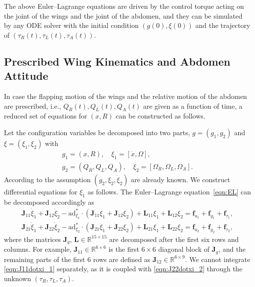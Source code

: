\documentclass[conf]{new-aiaa}
\renewcommand{\Re}{\ensuremath{\mathbb{R}}}
\newcommand{\ad}{\ensuremath{\mathrm{ad}}}
\begin{document}
The above Euler--Lagrange equations are driven by the control torque acting on the joint of the wings and the joint of the abdomen, 
and they can be simulated by any ODE solver with the initial condition $(g(0),\xi(0))$ and the trajectory of $(\tau_R(t),\tau_L(t),\tau_A(t))$. 

\subsection{Prescribed Wing Kinematics and Abdomen Attitude}

In case the flapping motion of the wings and the relative motion of the abdomen are prescribed, i.e., $Q_R(t), Q_L(t), Q_A(t)$ are given as a function of time, a reduced set of equations for $(x,R)$ can be constructed as follows. 

Let the configuration variables be decomposed into two parts, $g=(g_1,g_2)$ and $\xi=(\xi_1,\xi_2)$ with
\begin{gather}
    g_1 = (x, R), \quad \xi_1 = [\dot x, \Omega], \label{eqn:g1xi1}\\
    g_2 = (Q_R, Q_L, Q_A), \quad \xi_2 = [\Omega_R, \Omega_L, \Omega_A].\label{eqn:g2xi2}
\end{gather}
According to the assumption $(g_2,\xi_2,\dot\xi_2)$ are already known. 
We construct differential equations for $\xi_1$ as follows. 
The Euler--Lagrange equation~\eqref{eqn:EL} can be decomposed accordingly as
\begin{align}
    \mathbf{J}_{11}\dot \xi_1 + \mathbf{J}_{12}\dot\xi_2 -\ad^*_{\xi_1}\cdot(\mathbf{J}_{11}\xi_1 + \mathbf{J}_{12}\xi_2) + \mathbf{L}_{11}\xi_1 + \mathbf{L}_{12}\xi_2 = \mathbf{f}_{a_1} + \mathbf{f}_{g_1} + \mathbf{f}_{\tau_1},\label{eqn:J11dotxi_1}\\
    \mathbf{J}_{21}\dot \xi_1 + \mathbf{J}_{22}\dot\xi_2 -\ad^*_{\xi_2}\cdot(\mathbf{J}_{21}\xi_1 + \mathbf{J}_{22}\xi_2) + \mathbf{L}_{21}\xi_1 + \mathbf{L}_{22}\xi_2 = \mathbf{f}_{a_2} + \mathbf{f}_{g_2} + \mathbf{f}_{\tau_2},\label{eqn:J22dotxi_2}
\end{align}
where the matrices $\mathbf{J}_g$, $\mathbf{L}\in\Re^{15\times 15}$ are decomposed after the first six rows and columns. 
For example, $\mathbf{J}_{11}\in\Re^{6\times 6}$ is the first $6\times 6$ diagonal block of $\mathbf{J}_g$, and the remaining parts of the first 6 rows are defined as $\mathbf{J}_{12}\in\Re^{6\times 9}$. 
We cannot integrate \eqref{eqn:J11dotxi_1} separately, as it is coupled with \eqref{eqn:J22dotxi_2} through the unknown $(\tau_R,\tau_L,\tau_A)$.
\end{document}

